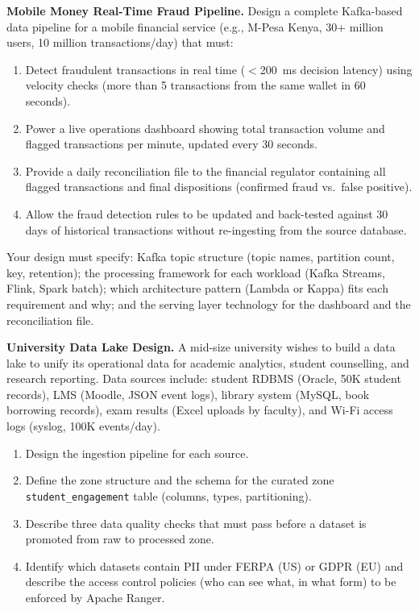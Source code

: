 \dpr \textbf{Mobile Money Real-Time Fraud Pipeline.}
Design a complete Kafka-based data pipeline for a mobile financial service
(e.g., M-Pesa Kenya, 30+ million users, 10 million transactions/day)
that must:
\begin{enumerate}[label=(\alph*)]
  \item Detect fraudulent transactions in real time ($<$200~ms decision
        latency) using velocity checks (more than 5 transactions from
        the same wallet in 60 seconds).
  \item Power a live operations dashboard showing total transaction
        volume and flagged transactions per minute, updated every 30
        seconds.
  \item Provide a daily reconciliation file to the financial regulator
        containing all flagged transactions and final dispositions
        (confirmed fraud vs.\ false positive).
  \item Allow the fraud detection rules to be updated and back-tested
        against 30 days of historical transactions without re-ingesting
        from the source database.
\end{enumerate}
Your design must specify: Kafka topic structure (topic names, partition
count, key, retention); the processing framework for each workload (Kafka
Streams, Flink, Spark batch); which architecture pattern (Lambda or Kappa)
fits each requirement and why; and the serving layer technology for the
dashboard and the reconciliation file.

\dpr \textbf{University Data Lake Design.}
A mid-size university wishes to build a data lake to unify its operational
data for academic analytics, student counselling, and research reporting.
Data sources include: student RDBMS (Oracle, 50K student records), LMS
(Moodle, JSON event logs), library system (MySQL, book borrowing records),
exam results (Excel uploads by faculty), and Wi-Fi access logs (syslog,
100K events/day).
\begin{enumerate}[label=(\alph*)]
  \item Design the ingestion pipeline for each source.
  \item Define the zone structure and the schema for the curated zone
        \texttt{student\_engagement} table (columns, types, partitioning).
  \item Describe three data quality checks that must pass before a dataset
        is promoted from raw to processed zone.
  \item Identify which datasets contain PII under FERPA (US) or GDPR
        (EU) and describe the access control policies (who can see what,
        in what form) to be enforced by Apache Ranger.
\end{enumerate}

